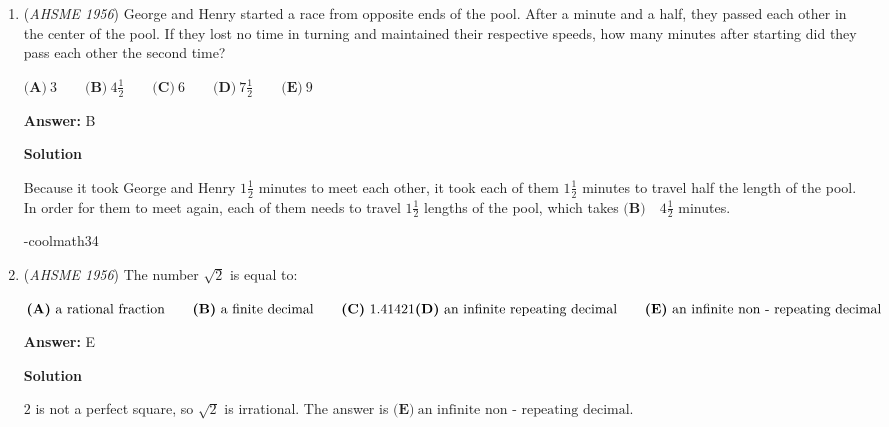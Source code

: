 \begin{enumerate}
 $\textbf{(A)}\ 20 \qquad\textbf{(B)}\ 38 \qquad\textbf{(C)}\ 44 \qquad\textbf{(D)}\ 104 \qquad\textbf{(E)}\ 110$

 \textbf{Answer: }E



\textbf{Solution}

The $20^{\text{th}}$ number will be the value of $20_{10}$ in base $4$. Thus, we see
 \[20_{10} = (1) \cdot 4^2 + (1) \cdot 4^1 + 0 \cdot 4^0\]
 \[= 110_{4}\]
$\boxed{E}$



	\item (\textit{AHSME 1956}) George and Henry started a race from opposite ends of the pool. After a minute and a half, 
they passed each other in the center of the pool. If they lost no time in turning and 
maintained their respective speeds, how many minutes after starting did they pass each other the second time? 


 $\textbf{(A)}\ 3\qquad \textbf{(B)}\ 4\frac{1}{2}\qquad \textbf{(C)}\ 6\qquad \textbf{(D)}\ 7\frac{1}{2}\qquad \textbf{(E)}\ 9$

 \textbf{Answer: }B



\textbf{Solution}

Because it took George and Henry $1 \frac{1}{2}$ minutes to meet each other, it took each of them $1 \frac{1}{2}$ minutes to travel half the length of the pool. In order for them to meet again, each of them needs to travel $1 \frac{1}{2}$ lengths of the pool, which takes $\boxed{\textbf{(B)} \quad 4\frac{1}{2}}$ minutes.

 -coolmath34

 


	\item (\textit{AHSME 1956}) The number $\sqrt {2}$ is equal to: 


 $\textbf{(A)}\ \text{a rational fraction} \qquad \textbf{(B)}\ \text{a finite decimal} \qquad \textbf{(C)}\ 1.41421 \\ \textbf{(D)}\ \text{an infinite repeating decimal} \qquad \textbf{(E)}\ \text{an infinite non - repeating decimal}$

 \textbf{Answer: }E



\textbf{Solution}

$2$ is not a perfect square, so $\sqrt{2}$ is irrational. The answer is $\boxed{\textbf{(E)}\ \text{an infinite non - repeating decimal}}.$




\end{enumerate}
